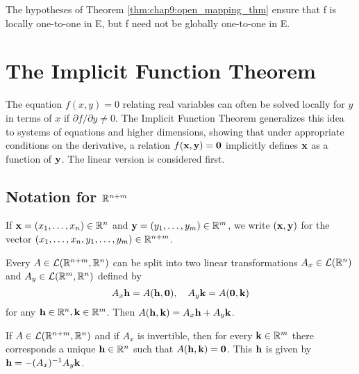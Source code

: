 \begin{remark}
  \label{rem:chap9:local_vs_global_one_to_one}
  The hypotheses of Theorem \ref{thm:chap9:open_mapping_thm} ensure
  that f is locally one-to-one in E, but f need not be globally one-to-one in E.
\end{remark}



\section{The Implicit Function Theorem}

The equation $f(x,y)=0$ relating real variables can often be solved
locally for $y$ in terms of $x$ if $\partial f/\partial y \ne 0$. The
Implicit Function Theorem generalizes this idea to systems of
equations and higher dimensions, showing that under appropriate
conditions on the derivative, a relation $f(\mathbf{x}, \mathbf{y}) =
\mathbf{0}$ implicitly defines $\mathbf{x}$ as a function of $\mathbf{y}$.
The linear version is considered first.

\subsection*{Notation for $\mathbb{R}^{n+m}$}
\label{sec:chap9:Rn+m_notation}
If $\mathbf{x} = (x_1, \dots, x_n) \in \mathbb{R}^n$ and $\mathbf{y} = (y_1,
\dots, y_m) \in \mathbb{R}^m$, we write $(\mathbf{x}, \mathbf{y})$ for the vector
$(x_1, \dots, x_n, y_1, \dots, y_m) \in \mathbb{R}^{n+m}$.

Every $A \in \mathcal{L}(\mathbb{R}^{n+m}, \mathbb{R}^n)$ can be split into two
linear transformations $A_x \in \mathcal{L}(\mathbb{R}^n)$ and $A_y \in
\mathcal{L}(\mathbb{R}^m, \mathbb{R}^n)$ defined by
\[
  A_x \mathbf{h} = A(\mathbf{h}, \mathbf{0}), \quad A_y \mathbf{k} =
  A(\mathbf{0}, \mathbf{k})
\]
for any $\mathbf{h} \in \mathbb{R}^n, \mathbf{k} \in \mathbb{R}^m$. Then $A(\mathbf{h},
\mathbf{k}) = A_x \mathbf{h} + A_y \mathbf{k}$.

\begin{theorem}
  \label{thm:chap9:linear_ift}
  If $A \in \mathcal{L}(\mathbb{R}^{n+m}, \mathbb{R}^n)$ and if $A_x$ is invertible,
  then for every $\mathbf{k} \in \mathbb{R}^m$ there corresponds a unique
  $\mathbf{h} \in \mathbb{R}^n$ such that $A(\mathbf{h}, \mathbf{k}) = \mathbf{0}$.
  This $\mathbf{h}$ is given by $\mathbf{h} = -(A_x)^{-1} A_y \mathbf{k}$.
\end{theorem}

